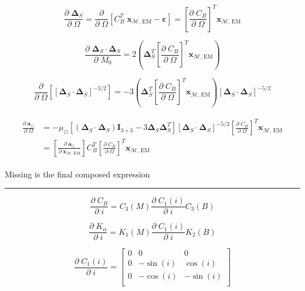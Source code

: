 \documentclass[]{article}
\newcommand{\pd}[2]{\frac{\partial\;#1}{\partial\;#2}}
\newcommand{\pddown}[2]{\frac{\partial}{\partial\;#2} \left[ #1 \right] }
\begin{document}
	\begin{equation*}
		\pd{\boldsymbol{\Delta}_S}{\Omega} = \pddown{C_B^T \; \mathbf{x}_{\mathcal{M}\text{, EM}} - \boldsymbol{\varepsilon}}{\Omega} = \left[ \pd{C_B}{\Omega} \right]^T \mathbf{x}_{\mathcal{M}\text{, EM}}
	\end{equation*}
	
	\begin{equation*}
		\pd{\boldsymbol{\Delta}_S \cdot \boldsymbol{\Delta}_S}{M_0} = 2\left( \boldsymbol{\Delta}_S^T \left[ \pd{C_B}{\Omega} \right]^T \mathbf{x}_{\mathcal{M}\text{, EM}} \right)
	\end{equation*}
	
	\begin{equation*}
		\pddown{ [\boldsymbol{\Delta}_S \cdot \boldsymbol{\Delta}_S]^{-3/2} }{\Omega} = -3 \left( \boldsymbol{\Delta}_S^T \left[ \pd{C_B}{\Omega} \right]^T \mathbf{x}_{\mathcal{M}\text{, EM}} \right) [\boldsymbol{\Delta}_S \cdot \boldsymbol{\Delta}_S]^{-5/2}
	\end{equation*}
	
	\begin{align}
	\begin{split}
		\pd{\mathbf{a}_{\odot}}{\Omega}
		&= -\mu_\odot \left[ (\boldsymbol{\Delta}_S \cdot \boldsymbol{\Delta}_S)\mathbf{I}_{3\times 3} - 3 \boldsymbol{\Delta}_S \boldsymbol{\Delta}_S^T \right] [\boldsymbol{\Delta}_S \cdot \boldsymbol{\Delta}_S]^{-5/2} \left[ \pd{C_B}{\Omega} \right]^T \mathbf{x}_{\mathcal{M}\text{, EM}} \\
		&= \left[\pd{\mathbf{a}_{\odot}}{ \mathbf{x}_{\mathcal{M}\text{, EM}} }\right] C_B^T \left[ \pd{C_B}{\Omega} \right]^T \mathbf{x}_{\mathcal{M}\text{, EM}}
	\end{split}
	\end{align}
	
	Missing is the final composed expression
	
	\hrule \vspace{1em}
	
	\begin{equation*}
		\pd{C_B}{i} = C_3(M) \pd{C_1(i)}{i} C_3(B)
	\end{equation*}
	
	\begin{equation*}
		\pd{K_\alpha}{i} = K_1(M) \pd{C_1(i)}{i} K_2(B)
	\end{equation*}
	
	\begin{equation*}
		\pd{C_1(i)}{i} = \begin{bmatrix}
			0 & 0 & 0 \\
			0 & -\sin{(i)} & \cos{(i)} \\
			0 & -\cos{(i)} & -\sin{(i)} \\
		\end{bmatrix}
	\end{equation*}
	
\end{document}
